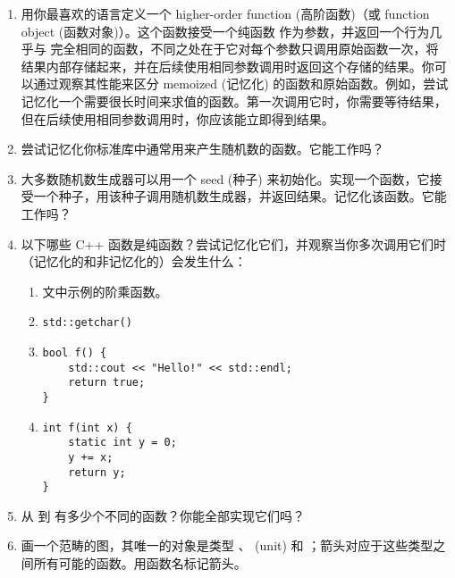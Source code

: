 \begin{enumerate}
  \tightlist
  \item
        用你最喜欢的语言定义一个 higher-order function (高阶函数)（或 function object (函数对象)）。这个函数接受一个纯函数  作为参数，并返回一个行为几乎与  完全相同的函数，不同之处在于它对每个参数只调用原始函数一次，将结果内部存储起来，并在后续使用相同参数调用时返回这个存储的结果。你可以通过观察其性能来区分 memoized (记忆化) 的函数和原始函数。例如，尝试记忆化一个需要很长时间来求值的函数。第一次调用它时，你需要等待结果，但在后续使用相同参数调用时，你应该能立即得到结果。
  \item
        尝试记忆化你标准库中通常用来产生随机数的函数。它能工作吗？
  \item
        大多数随机数生成器可以用一个 seed (种子) 来初始化。实现一个函数，它接受一个种子，用该种子调用随机数生成器，并返回结果。记忆化该函数。它能工作吗？
  \item
        以下哪些 C++ 函数是纯函数？尝试记忆化它们，并观察当你多次调用它们时（记忆化的和非记忆化的）会发生什么：

        \begin{enumerate}
          \tightlist
          \item
                文中示例的阶乘函数。
          \item
                \begin{verbatim}
std::getchar()
\end{verbatim}
          \item
                \begin{verbatim}
bool f() {
    std::cout << "Hello!" << std::endl;
    return true;
}
\end{verbatim}
          \item
                \begin{verbatim}
int f(int x) {
    static int y = 0;
    y += x;
    return y;
}
\end{verbatim}
        \end{enumerate}
  \item
        从  到  有多少个不同的函数？你能全部实现它们吗？
  \item
        画一个范畴的图，其唯一的对象是类型 、\code{()} (unit) 和 ；箭头对应于这些类型之间所有可能的函数。用函数名标记箭头。
\end{enumerate}